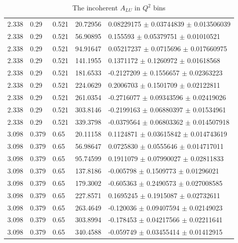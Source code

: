 \begin{table}[!h]
\begin{center}
\begin{tabular}{||l|l|l|l|l||}
  2.338 & 0.29 & 0.521  &    20.72956  &  0.08229175 $\pm$  0.03744839  $\pm$  0.013506039    \\ 
  2.338 & 0.29 & 0.521  &    56.90895  &  0.155593   $\pm$  0.05379751  $\pm$  0.01010521     \\ 
  2.338 & 0.29 & 0.521  &    94.91647  &  0.05217237 $\pm$  0.0715696   $\pm$  0.017660975    \\ 
  2.338 & 0.29 & 0.521  &    141.1955  &  0.1371172  $\pm$  0.1260972   $\pm$  0.01618568     \\ 
  2.338 & 0.29 & 0.521  &    181.6533  &  -0.2127209 $\pm$  0.1556657   $\pm$  0.02363223     \\ 
  2.338 & 0.29 & 0.521  &    224.0629  &  0.2006703  $\pm$  0.1501709   $\pm$  0.02122811     \\ 
  2.338 & 0.29 & 0.521  &    261.0354  &  -0.2716077 $\pm$  0.09343596  $\pm$  0.02419026     \\ 
  2.338 & 0.29 & 0.521  &    303.8146  &  -0.2199163 $\pm$  0.06880397  $\pm$  0.01534961     \\ 
  2.338 & 0.29 & 0.521  &    339.3798  &  -0.0379564 $\pm$  0.06803362  $\pm$  0.014507918    \\ 
 \hline
                                                                      
  3.098 &0.379 & 0.65  &     20.11158  &  0.1124871  $\pm$  0.03615842  $\pm$  0.014743619    \\ 
  3.098 &0.379 & 0.65  &     56.98647  &  0.0725830  $\pm$  0.0555646   $\pm$  0.014717011    \\ 
  3.098 &0.379 & 0.65  &     95.74599  &  0.1911079  $\pm$  0.07990027  $\pm$  0.02811833     \\ 
  3.098 &0.379 & 0.65  &     137.8186  &  -0.005798  $\pm$  0.1509773   $\pm$  0.01296021     \\ 
  3.098 &0.379 & 0.65  &     179.3002  &  -0.605363  $\pm$  0.2490573   $\pm$  0.027008585    \\ 
  3.098 &0.379 & 0.65  &     227.8571  &  0.1695245  $\pm$  0.1915087   $\pm$  0.02732611     \\ 
  3.098 &0.379 & 0.65  &     263.4649  &  -0.120036  $\pm$  0.09407594  $\pm$  0.02149023     \\ 
  3.098 &0.379 & 0.65  &     303.8994  &  -0.178453  $\pm$  0.04217566  $\pm$  0.02211641     \\ 
  3.098 &0.379 & 0.65  &     340.4588  &  -0.059749  $\pm$  0.03455414  $\pm$  0.01412915     \\ 
 \hline
 \hline
      \end{tabular}
      \caption{The incoherent $A_{LU}$ in $Q^2$ bins}
      \label{table:InCoh_Q2_BSA}
   \end{center}
\end{table}


